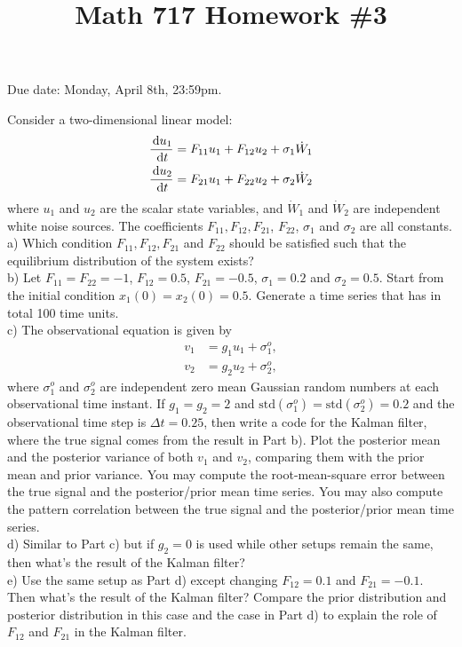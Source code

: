 \documentclass[a4paper,notitlepage,cs4size,cap,indent,oneside,12pt]{article}
\title{Math 717 Homework \#3}
\author{}
\date{}
\numberwithin{equation}{section}
\numberwithin{figure}{section}
\begin{document}
\maketitle%
Due date: Monday, April 8th, 23:59pm.\medskip

\noindent  Consider a two-dimensional linear model:
\begin{equation*}
\begin{split}
    \frac{{\, \rm d} u_1}{{\, \rm d} t} &= F_{11}u_1 + F_{12}u_2 +\sigma_1\dot{W}_{1}\\
    \frac{{\, \rm d} u_2}{{\, \rm d} t} &= F_{21}u_1 + F_{22}u_2 +\sigma_2\dot{W}_{2}
\end{split}
\end{equation*}
where $u_1$ and $u_2$ are the scalar state variables, and $\dot{W}_{1}$ and $\dot{W}_{2}$ are independent white noise sources. The coefficients  $F_{11}, F_{12}, F_{21}$, $F_{22}$, $\sigma_1$ and $\sigma_2$ are all constants.\\
a) Which condition $F_{11}, F_{12}, F_{21}$ and $F_{22}$ should be satisfied such that the equilibrium distribution of the system exists?\\
b) Let $F_{11} = F_{22} = -1$, $F_{12} = 0.5$, $F_{21}=-0.5$, $\sigma_1 = 0.2$ and $\sigma_2 = 0.5$. Start from the initial condition $x_1(0)=x_2(0) = 0.5$. Generate a time series that has in total 100 time units. \\
c) The observational equation is given by
\begin{equation*}
\begin{split}
    v_1 &= g_{1}u_1 +\sigma^{o}_1,\\
    v_2 &= g_{2}u_2 +\sigma^{o}_2,
\end{split}
\end{equation*}
where $\sigma^o_1$ and $\sigma^o_2$ are independent zero mean Gaussian random numbers at each observational time instant. If $g_1 = g_2 = 2$ and $\mbox{std}(\sigma^o_1)=\mbox{std}(\sigma^o_2)=0.2$ and the observational time step is $\Delta{t}=0.25$, then write a code for the Kalman filter, where the true signal comes from the result in Part b). Plot the posterior mean and the posterior variance of both $v_1$ and $v_2$, comparing them with the prior mean and prior variance. You may compute the root-mean-square error between the true signal and the posterior/prior mean time series. You may also compute the pattern correlation between the true signal and the posterior/prior mean time series.\\
d) Similar to Part c) but if $g_2=0$ is used while other setups remain the same, then what's the result of the Kalman filter? \\
e) Use the same setup as Part d) except changing  $F_{12} = 0.1$ and $F_{21} = -0.1$. Then what's the result of the Kalman filter? Compare the prior distribution and posterior distribution in this case and the case in Part d) to explain the role of $F_{12}$ and $F_{21}$ in the  Kalman filter.\\~\\
\end{document}
